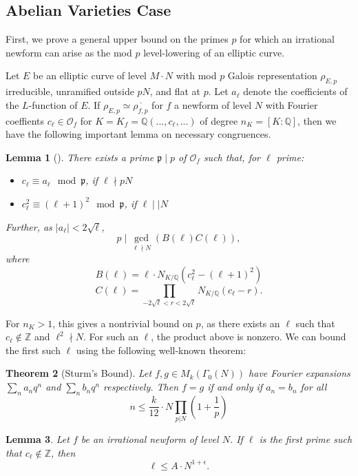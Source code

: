 \documentclass[12pt]{amsart}
\newtheorem{thm}{Theorem}[section]
\newtheorem{lem}[thm]{Lemma}
\theoremstyle{definition}
\def\O{{\mathcal O}}
\def\Q{{\mathbb Q}}
\def\Z{{\mathbb Z}}
\renewcommand{\bar}{\overline}
\begin{document}
\subsection{Abelian Varieties Case}
First, we prove a general upper bound on the primes $p$ for which an irrational newform can arise as the mod $p$ level-lowering of an elliptic curve.

Let $E$ be an elliptic curve of level $M \cdot N$ with mod $p$ Galois representation $\rho_{E,p}$ irreducible, unramified outside $pN$, and flat at $p$. Let $a_\ell$ denote the coefficients of the $L$-function of $E$.  If $\rho_{E,p} \simeq \bar{\rho_{f,p}}$ for $f$ a newform of level $N$ with Fourier coeffients $c_\ell\in \O_f$ for $K = K_f = \Q(...,c_\ell,...)$ of degree $n_K = [K:\mathbb{Q}]$, then we have the following important lemma on necessary congruences.

\begin{lem}[\cite{cohen06}]\label{ircong1}
There exists a prime $\mathfrak{p} \mid p$ of $\mathcal{O}_f$ such that, for $\ell$ prime:
\begin{itemize}
\item $c_\ell \equiv a_\ell \mod \mathfrak{p}$, if $\ell \nmid pN$
\item $c_\ell^2 \equiv (\ell+1)^2 \mod \mathfrak{p}$, if $\ell \mid\mid N$
\end{itemize}
Further, as $|a_\ell| < 2\sqrt{\ell}$,
\[p \mid \gcd_{\ell \nmid N}(B(\ell)C(\ell)), \] where
\[B(\ell) = \ell \cdot N_{K / \mathbb{Q}}(c_\ell^2-(\ell+1)^2) \]
\[C(\ell) = \prod_{-2\sqrt{\ell} < r < 2\sqrt{\ell}}{N_{K / \mathbb{Q}}}(c_\ell - r).\]
\end{lem}

For $n_K > 1$, this gives a nontrivial bound on $p$, as there exists an $\ell$ such that $c_\ell \notin \mathbb{Z}$ and $\ell^2 \nmid N$. For such an $\ell$, the product above is nonzero. We can bound the first such $\ell$ using the following well-known theorem:
\begin{thm}[Sturm's Bound]\label{sturm}
Let $f,g \in M_k(\Gamma_0(N))$ have Fourier expansions $\sum_n a_nq^n$ and $\sum_n b_n q^n$ respectively.  Then $f = g$ if and only if $a_n = b_n$ for all
\[ n \leq \frac{k}{12} \cdot N \prod_{p|N} \left(1 + \frac{1}{p} \right) \]
\end{thm}

\begin{lem}\label{boundell}
Let $f$ be an irrational newform of level $N$.  If $\ell$ is the first prime such that $c_\ell \not\in \Z$, then
\[ \ell \leq A \cdot N^{1+\epsilon} .\]
\end{lem}
\end{document}
